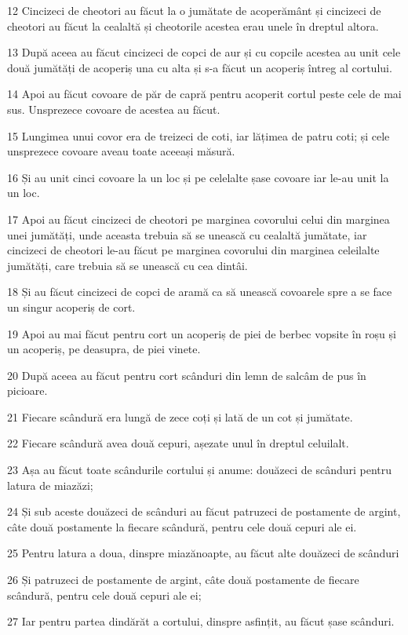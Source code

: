 \par 12 Cincizeci de cheotori au făcut la o jumătate de acoperământ și cincizeci de cheotori au făcut la cealaltă și cheotorile acestea erau unele în dreptul altora.
\par 13 După aceea au făcut cincizeci de copci de aur și cu copcile acestea au unit cele două jumătăți de acoperiș una cu alta și s-a făcut un acoperiș întreg al cortului.
\par 14 Apoi au făcut covoare de păr de capră pentru acoperit cortul peste cele de mai sus. Unsprezece covoare de acestea au făcut.
\par 15 Lungimea unui covor era de treizeci de coti, iar lățimea de patru coti; și cele unsprezece covoare aveau toate aceeași măsură.
\par 16 Și au unit cinci covoare la un loc și pe celelalte șase covoare iar le-au unit la un loc.
\par 17 Apoi au făcut cincizeci de cheotori pe marginea covorului celui din marginea unei jumătăți, unde aceasta trebuia să se unească cu cealaltă jumătate, iar cincizeci de cheotori le-au făcut pe marginea covorului din marginea celeilalte jumătăți, care trebuia să se unească cu cea dintâi.
\par 18 Și au făcut cincizeci de copci de aramă ca să unească covoarele spre a se face un singur acoperiș de cort.
\par 19 Apoi au mai făcut pentru cort un acoperiș de piei de berbec vopsite în roșu și un acoperiș, pe deasupra, de piei vinete.
\par 20 După aceea au făcut pentru cort scânduri din lemn de salcâm de pus în picioare.
\par 21 Fiecare scândură era lungă de zece coți și lată de un cot și jumătate.
\par 22 Fiecare scândură avea două cepuri, așezate unul în dreptul celuilalt.
\par 23 Așa au făcut toate scândurile cortului și anume: douăzeci de scânduri pentru latura de miazăzi;
\par 24 Și sub aceste douăzeci de scânduri au făcut patruzeci de postamente de argint, câte două postamente la fiecare scândură, pentru cele două cepuri ale ei.
\par 25 Pentru latura a doua, dinspre miazănoapte, au făcut alte douăzeci de scânduri
\par 26 Și patruzeci de postamente de argint, câte două postamente de fiecare scândură, pentru cele două cepuri ale ei;
\par 27 Iar pentru partea dindărăt a cortului, dinspre asfințit, au făcut șase scânduri.
